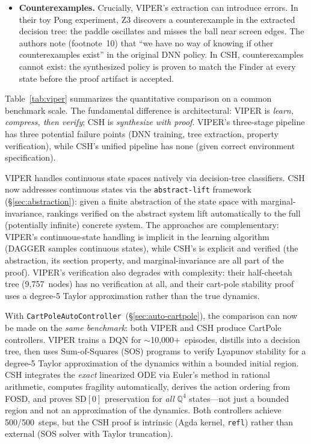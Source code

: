 \documentclass[9pt,a4paper]{article}
\theoremstyle{plain}
\theoremstyle{definition}
\theoremstyle{remark}
\begin{document}
\begin{itemize}
\item \textbf{Counterexamples.}  Crucially, VIPER's extraction can introduce errors.  In their toy Pong experiment, Z3 discovers a counterexample in the extracted decision tree: the paddle oscillates and misses the ball near screen edges.  The authors note (footnote~10) that ``we have no way of knowing if other counterexamples exist'' in the original DNN policy.  In CSH, counterexamples cannot exist: the synthesized policy is proven to match the Finder at every state before the proof artifact is accepted.
\end{itemize}

\noindent Table~\ref{tab:viper} summarizes the quantitative comparison on a common benchmark scale.  The fundamental difference is architectural: VIPER is \emph{learn, compress, then verify}; CSH is \emph{synthesize with proof}.  VIPER's three-stage pipeline has three potential failure points (DNN training, tree extraction, property verification), while CSH's unified pipeline has none (given correct environment specification).

VIPER handles continuous state spaces natively via decision-tree classifiers.  CSH now addresses continuous states via the \texttt{abstract-lift} framework (\S\ref{sec:abstraction}): given a finite abstraction of the state space with marginal-invariance, rankings verified on the abstract system lift automatically to the full (potentially infinite) concrete system.  The approaches are complementary: VIPER's continuous-state handling is implicit in the learning algorithm (DAGGER samples continuous states), while CSH's is explicit and verified (the abstraction, its section property, and marginal-invariance are all part of the proof).  VIPER's verification also degrades with complexity: their half-cheetah tree (9{,}757~nodes) has no verification at all, and their cart-pole stability proof uses a degree-5 Taylor approximation rather than the true dynamics.

With \texttt{CartPoleAutoController}~(\S\ref{sec:auto-cartpole}), the comparison can now be made on the \emph{same benchmark}: both VIPER and CSH produce CartPole controllers.  VIPER trains a DQN for ${\sim}$10{,}000+~episodes, distills into a decision tree, then uses Sum-of-Squares (SOS) programs to verify Lyapunov stability for a degree-5 Taylor approximation of the dynamics within a bounded initial region.  CSH integrates the \emph{exact} linearized ODE via Euler's method in rational arithmetic, computes fragility automatically, derives the action ordering from FOSD, and proves SD$[0]$ preservation for \emph{all} $\mathbb{Q}^4$ states---not just a bounded region and not an approximation of the dynamics.  Both controllers achieve 500/500~steps, but the CSH proof is intrinsic (Agda kernel, \texttt{refl}) rather than external (SOS solver with Taylor truncation).
\end{document}
